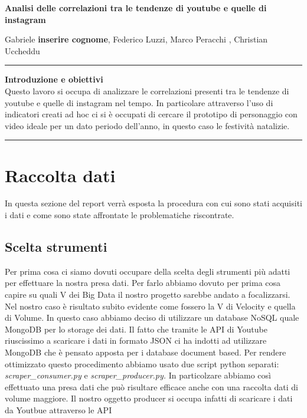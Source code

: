 \documentclass[10pt, a4paper,openany]{article}
\begin{document}
\begin{center}
\textbf{Analisi delle correlazioni tra le tendenze di youtube e quelle di instagram}
\end{center}

\begin{center}
Gabriele \textbf{inserire cognome}, Federico Luzzi,  Marco Peracchi , Christian Uccheddu
\end{center}

\hrule
\vspace{0.5cm}

\centering\textbf{{Introduzione e obiettivi}}
\\
Questo lavoro si occupa di analizzare le correlazioni presenti tra le tendenze di youtube e quelle di instagram nel tempo. In particolare attraverso l'uso di indicatori creati ad hoc ci si è occupati di cercare il prototipo di personaggio con video ideale per un dato periodo dell'anno, in questo caso le festività natalizie.
\vspace{0.5cm}
\hrule

\flushleft
\section*{Raccolta dati}

In questa sezione del report verrà esposta la procedura con cui sono stati acquisiti i dati e come sono state affrontate le problematiche riscontrate.
\subsection*{Scelta strumenti}
Per prima cosa ci siamo dovuti occupare della scelta degli strumenti più adatti per effettuare la nostra presa dati. Per farlo abbiamo dovuto per prima cosa capire su quali V dei Big Data il nostro progetto sarebbe andato a focalizzarsi. Nel nostro caso è risultato subito evidente come fossero la V di Velocity e quella di Volume. In questo caso abbiamo deciso di utilizzare un database NoSQL quale MongoDB per lo storage dei dati. Il fatto che tramite le API di Youtube riuscissimo a scaricare i dati in formato JSON ci ha indotti ad utilizzare MongoDB che è pensato apposta per i database document based. Per rendere ottimizzato questo procedimento abbiamo usato due script python separati: \textit{scraper\_consumer.py} e \textit{scraper\_producer.py.} In particolzare abbiamo così effettuato una presa dati che può risultare efficace anche con una raccolta dati di volume maggiore. Il nostro oggetto producer si occupa infatti di scaricare i dati da Youtbue attraverso le API
\end{document}
